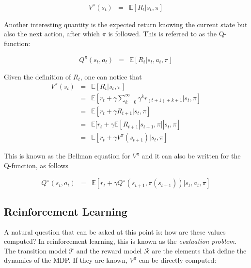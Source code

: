 				\begin{eqnarray}
					V^{\pi} (s_t) & = & \mathbb{E} [R_t | s_t, \pi] \label{eq:valuefunc}
				\end{eqnarray}
					
			Another interesting quantity is the expected return knowing the current state but also the next action, after which $\pi$ is followed. This is referred to as the Q-function:
				
				\begin{eqnarray}
					Q^{\pi} (s_t,a_t) & = & \mathbb{E} [R_t | s_t, a_t, \pi] \label{eq:qfunc}
				\end{eqnarray}
					
			Given the definition of $R_t$, one can notice that 
			\begin{eqnarray}
					V^{\pi} (s_t)   & = & \mathbb{E} [R_t | s_t, \pi] \nonumber \\
					& = & \mathbb{E} [r_t + \gamma \sum_{k=0}^\infty \gamma^k r_{(t+1)+k+1} | s_t, \pi] \nonumber \\
					& = & \mathbb{E} [r_t + \gamma R_{t+1} | s_t, \pi] \nonumber \\
					& = & \mathbb{E} [r_t + \gamma \mathbb{E} [R_{t+1}|s_{t+1}, \pi] | s_t, \pi] \nonumber \\
					& = & \mathbb{E} [r_t + \gamma V^{\pi} (s_{t+1}) | s_t, \pi] \label{eq:vbellman}
			\end{eqnarray}
					
		This is known as the Bellman equation for $V^{\pi}$ and it can also be written for the Q-function, as follows
				
				\begin{eqnarray}
					Q^{\pi} (s_t,a_t) & = & \mathbb{E} [r_t + \gamma Q^{\pi} (s_{t+1}, \pi(s_{t+1})) | s_t, a_t, \pi] \label{eq:qbellman}
				\end{eqnarray}
	
	\subsection{Reinforcement Learning}
            
			A natural question that can be asked at this point is: how are these values computed? In reinforcement learning, this is known as the \textit{evaluation problem}. The transition model $\mathscr{T}$ and the reward model $\mathscr{R}$ are the elements that define the dynamics of the MDP. If they are known, $V^{\pi}$ can be directly computed:
			
